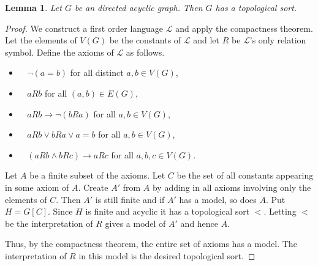 \documentclass[12pt]{kluwer}
\newtheorem{lem}[thm]{Lemma}
\theoremstyle{remark}
\newcommand{\fancy}[1]{\mathcal{#1}}
\begin{document}
\begin{lem}\label{TopSortExists}
Let $G$ be an directed acyclic graph. Then $G$ has a topological sort.
\end{lem}
\begin{proof}
We construct a first order language $\fancy{L}$ and apply the compactness theorem.  Let the elements of $V(G)$ be the constants of $\fancy{L}$ and let $R$ be $\fancy{L}$'s only relation symbol.  Define the axioms of $\fancy{L}$ as follows.

\begin{itemize}
\item $\;\;$ $\neg (a = b)$ for all distinct $a,b \in V(G)$,
\item $\;\;$ $aRb$ for all $(a,b) \in E(G)$,
\item $\;\;$ $aRb \rightarrow \neg (bRa)$ for all $a,b \in V(G)$,
\item $\;\;$ $aRb \vee bRa \vee a = b$ for all $a,b \in V(G)$,
\item $\;\;$ $(aRb \wedge bRc) \rightarrow aRc$ for all $a,b,c \in V(G)$.
\end{itemize}

Let $A$ be a finite subset of the axioms.  Let $C$ be the set of all constants appearing in some axiom of $A$.  Create $A'$ from $A$ by adding in all axioms involving only the elements of $C$.  Then $A'$ is still finite and if $A'$ has a model, so does $A$.  Put $H = G[C]$.  Since $H$ is finite and acyclic it has a topological sort $<$.  Letting $<$ be the interpretation of $R$ gives a model of $A'$ and hence $A$.

Thus, by the compactness theorem, the entire set of axioms has a model.  The interpretation of $R$ in this model is the desired topological sort.
\end{proof}
\end{document}
